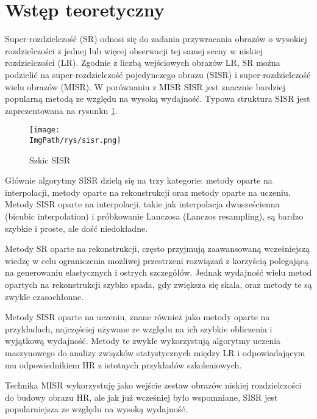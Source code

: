 \documentclass[a4paper,12pt,twoside,openany]{report}
\newcommand{\ImgPath}{.}
\begin{document}

\section{Wstęp teoretyczny}
	Super-rozdzielczość (SR) odnosi się do zadania przywracania obrazów o wysokiej rozdzielczości z jednej lub więcej obserwacji tej samej sceny w niskiej rozdzielczości (LR). Zgodnie z liczbą wejściowych obrazów LR, SR można podzielić na super-rozdzielczość pojedynczego obrazu (SISR) i super-rozdzielczość wielu obrazów (MISR). W porównaniu z MISR SISR jest znacznie bardziej popularną metodą ze względu na wysoką wydajność. Typowa struktura SISR jest zaprezentowana na rysunku \ref{szkicSisr}.
	\begin{figure}[!htbp]
		\begin{center}
			\centering
			\texttt{[image: \\ImgPath/rys/sisr.png]}
		\end{center}
		\caption{Szkic SISR}
		\label{szkicSisr}
	\end{figure}
  	\newpage
  	Głównie algorytmy SISR dzielą się na trzy kategorie: metody oparte na interpolacji, metody oparte na rekonstrukcji oraz metody oparte na uczeniu. Metody SISR oparte na interpolacji, takie jak interpolacja dwusześcienna (bicubic interpolation) i próbkowanie Lanczosa (Lanczos resampling), są bardzo szybkie i proste, ale dość niedokładne.
  	  
  	Metody SR oparte na rekonstrukcji,  często przyjmują zaawansowaną wcześniejszą wiedzę w celu ograniczenia możliwej przestrzeni rozwiązań z korzyścią polegającą na generowaniu elastycznych i ostrych szczegółów. Jednak wydajność wielu metod opartych na rekonstrukcji szybko spada, gdy zwiększa się skala, oraz metody te są zwykle czasochłonne.
  
  	Metody SISR oparte na uczeniu, znane również jako metody oparte na przykładach, najczęściej używane ze względu na ich szybkie obliczenia i wyjątkową wydajność. Metody te zwykle wykorzystują algorytmy uczenia maszynowego do analizy związków statystycznych między LR i odpowiadającym mu odpowiednikiem HR z istotnych przykładów szkoleniowych.
  
  	Technika MISR wykorzystuję jako wejście zestaw obrazów niskiej rozdzielczości do budowy obrazu HR, ale jak już wcześniej było wspomniane, SISR jest popularniejsza ze względu na wysoką wydajność.

  
\end{document}
